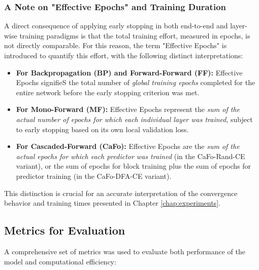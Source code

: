\subsubsection{A Note on "Effective Epochs" and Training Duration}
\label{subsec:methodology_effective_epochs}
A direct consequence of applying early stopping in both end-to-end and layer-wise training paradigms is that the total training effort, measured in epochs, is not directly comparable. For this reason, the term "Effective Epochs" is introduced to quantify this effort, with the following distinct interpretations:
\begin{itemize}
    \item \textbf{For Backpropagation (BP) and Forward-Forward (FF):} Effective Epochs signifieS the total number of \emph{global training epochs} completed for the entire network before the early stopping criterion was met.
    \item \textbf{For Mono-Forward (MF):} Effective Epochs represent the \emph{sum of the actual number of epochs for which each individual layer was trained}, subject to early stopping based on its own local validation loss.
    \item \textbf{For Cascaded-Forward (CaFo):} Effective Epochs are the \emph{sum of the actual epochs for which each predictor was trained} (in the CaFo-Rand-CE variant), or the sum of epochs for block training plus the sum of epochs for predictor training (in the CaFo-DFA-CE variant).
\end{itemize}
This distinction is crucial for an accurate interpretation of the convergence behavior and training times presented in Chapter \ref{chap:experiments}.

\subsection{Metrics for Evaluation}
\label{sec:methodology_metrics}
A comprehensive set of metrics was used to evaluate both performance of the model and computational efficiency:


